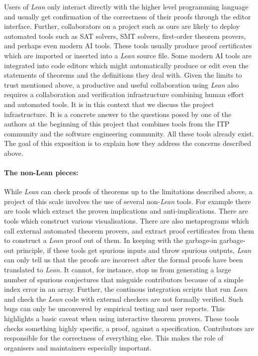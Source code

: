 Users of \emph{Lean} only interact directly with the higher level programming language and usually get confirmation of the correctness of their proofs through the editor interface. Further, collaborators on a project such as ours are likely to deploy automated tools such as SAT solvers, SMT solvers, first-order theorem provers, and perhaps even modern AI tools. These tools usually produce proof certificates which are imported or inserted into a \emph{Lean} source file. Some modern AI tools are integrated into code editors which might automatically produce or edit even the statements of theorems and the definitions they deal with. Given the limits to trust mentioned above, a productive and useful collaboration using \emph{Lean} also requires a collaboration and verification infrastructure combining human effort and automated tools. It is in this context that we discuss the project infrastructure. It is a concrete answer to the questions posed by one of the authors at the beginning of this project \cite{Tao_blog_Sep_2024} that combines tools from the ITP community and the software engineering community. All these tools already exist. The goal of this exposition is to explain how they address the concerns described above.


\paragraph{\textbf{The non-Lean pieces:}} While \emph{Lean} can check proofs of theorems up to the limitations described above, a project of this scale involves the use of several non-\emph{Lean} tools. For example there are tools which extract the proven implications and anti-implications. There are tools which construct various visualisations. There are also metaprograms which call external automated theorem provers, and extract proof certificates from them to construct a \emph{Lean} proof out of them. In keeping with the garbage-in garbage-out principle, if these tools get spurious inputs and throw spurious outputs, \emph{Lean} can only tell us that the proofs are incorrect after the formal proofs have been translated to \emph{Lean}. It cannot, for instance, stop us from generating a large number of spurious conjectures that misguide contributors because of a simple index error in an array. Further, the continous integration scripts that run \emph{Lean} and check the \emph{Lean} code with external checkers are not formally verified. Such bugs can only be unconvered by empirical testing and user reports. This highlights a basic caveat when using interactive theorem provers. These tools checks something highly specific, a proof, against a specification. Contributors are responsible for the correctness of everything else. This makes the role of organisers and maintainers especially important.

